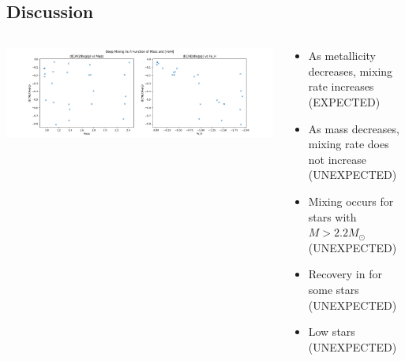 \subsection{Discussion}
\begin{frame}
\begin{columns}
   \begin{column}{0.5\textwidth}
        \includegraphics[width=1.2\columnwidth]{Figures/DeepMixingRate.png}
   \end{column}
\begin{column}{0.5\textwidth}
     
   \begin{itemize}
        \item As metallicity decreases, mixing rate increases (EXPECTED)
        \item As mass decreases, mixing rate does not increase (UNEXPECTED)
        \item Mixing occurs for stars with $M>2.2M_\odot$ (UNEXPECTED)
        \item Recovery in \CN for some stars (UNEXPECTED)
        \item Low \CN stars (UNEXPECTED)
   \end{itemize}
\end{column}
\end{columns}
\end{frame}


